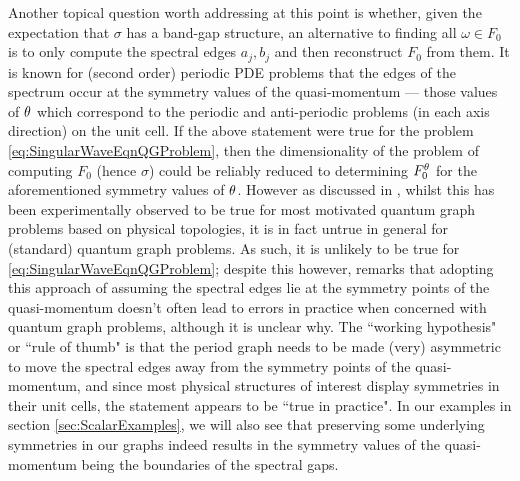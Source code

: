Another topical question worth addressing at this point is whether, given the expectation that $\sigma$ has a band-gap structure, an alternative to finding all $\omega\in F_0$ is to only compute the spectral edges $a_j, b_j$ and then reconstruct $F_0$ from them.
It is known for (second order) periodic PDE problems that the edges of the spectrum occur at the symmetry values of the quasi-momentum --- those values of $\theta$ which correspond to the periodic and anti-periodic problems (in each axis direction) on the unit cell.
If the above statement were true for the problem \eqref{eq:SingularWaveEqnQGProblem}, then the dimensionality of the problem of computing $F_0$ (hence $\sigma$) could be reliably reduced to determining $F_0^\theta$ for the aforementioned symmetry values of $\theta$.
However as discussed in \cite[Chapter 4.6]{berkolaiko2013introduction}, whilst this has been experimentally observed to be true for most motivated quantum graph problems based on physical topologies, it is in fact untrue in general for (standard) quantum graph problems.
As such, it is unlikely to be true for \eqref{eq:SingularWaveEqnQGProblem}; despite this however, \cite[Chapter 4.6]{berkolaiko2013introduction} remarks that adopting this approach of assuming the spectral edges lie at the symmetry points of the quasi-momentum doesn't often lead to errors in practice when concerned with quantum graph problems, although it is unclear why.
The ``working hypothesis" or ``rule of thumb" is that the period graph needs to be made (very) asymmetric to move the spectral edges away from the symmetry points of the quasi-momentum, and since most physical structures of interest display symmetries in their unit cells, the statement appears to be ``true in practice".
In our examples in section \ref{sec:ScalarExamples}, we will also see that preserving some underlying symmetries in our graphs indeed results in the symmetry values of the quasi-momentum being the boundaries of the spectral gaps.

